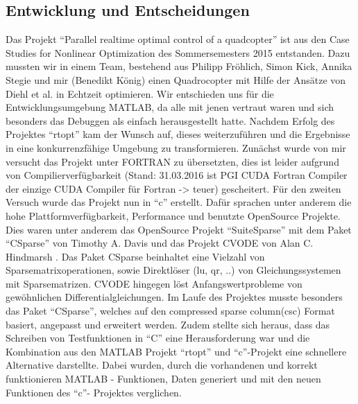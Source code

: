 \documentclass{scrartcl}
\begin{document}
\subsection{Entwicklung und Entscheidungen}
Das Projekt ``Parallel realtime optimal control of a quadcopter'' ist aus den Case Studies for Nonlinear Optimization des Sommersemesters 2015 entstanden. Dazu mussten wir in einem Team, bestehend aus Philipp Fröhlich, Simon Kick, Annika Stegie und mir (Benedikt König) einen Quadrocopter mit Hilfe der Ansätze von Diehl et al.\cite{Diehl2001, Diehl2002} in Echtzeit optimieren. Wir entschieden uns für die Entwicklungsumgebung MATLAB, da alle mit jenen vertraut waren und sich besonders das Debuggen als einfach herausgestellt hatte. Nachdem Erfolg des Projektes ``rtopt'' kam der Wunsch auf, dieses weiterzuführen und die Ergebnisse in eine konkurrenzfähige Umgebung zu transformieren. Zunächst wurde von mir versucht das Projekt unter FORTRAN zu übersetzten, dies ist leider aufgrund von Compilierverfügbarkeit (Stand: 31.03.2016 ist PGI CUDA Fortran Compiler der einzige CUDA Compiler für Fortran -> teuer) gescheitert. Für den zweiten Versuch wurde das Projekt nun in ``c'' erstellt. Dafür sprachen unter anderem die hohe Plattformverfügbarkeit, Performance und benutzte OpenSource Projekte. Dies waren unter anderem das OpenSource Projekt ``SuiteSparse'' mit dem Paket ``CSparse'' von Timothy A. Davis \cite{davis2006direct} und das Projekt CVODE von Alan C. Hindmarsh \cite{Hindmarsh1996}. Das Paket CSparse beinhaltet eine Vielzahl von Sparsematrixoperationen, sowie Direktlöser (lu, qr, ..) von Gleichungssystemen mit Sparsematrizen. CVODE hingegen löst Anfangswertprobleme von gewöhnlichen Differentialgleichungen. Im Laufe des Projektes musste besonders das Paket ``CSparse'', welches auf den compressed sparse column(csc) Format basiert, angepasst und erweitert werden. Zudem stellte sich heraus, dass das Schreiben von Testfunktionen in ``C'' eine Herausforderung war und die Kombination aus den MATLAB Projekt ``rtopt'' und ``c''-Projekt eine schnellere Alternative darstellte. Dabei wurden, durch die vorhandenen und korrekt funktionieren MATLAB - Funktionen, Daten generiert und mit den neuen Funktionen des ``c''- Projektes verglichen. 










\end{document}
